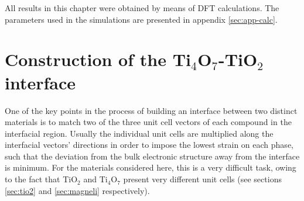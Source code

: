 All results in this chapter were obtained by means of DFT calculations. The parameters used in the simulations are presented in appendix \ref{sec:app-calc}.

\section{Construction of the Ti$_4$O$_7$-TiO$_2$ interface}
\label{sec:interface}

One of the key points in the process of building an interface between two distinct materials is to match two of the three unit cell vectors of each compound in the interfacial region. Usually the individual unit cells are multiplied along the interfacial vectors' directions in order to impose the lowest strain on each phase, such that the deviation from the bulk electronic structure away from the interface is minimum. For the materials considered here, this is a very difficult task, owing to the fact that TiO$_2$ and Ti$_4$O$_7$ present very different unit cells (see sections \ref{sec:tio2} and \ref{sec:magneli} respectively).

